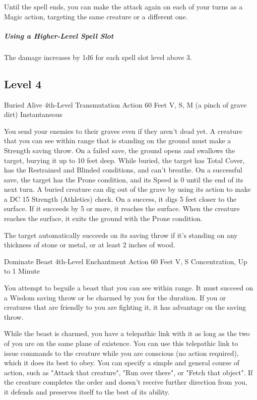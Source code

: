 \documentclass[letterpaper,openany,oneside,twocolumn]{book}
\begin{document}
Until the spell ends, you can make the attack again on each of your turns as a Magic action, targeting the same creature or a different one.

\subparagraph*{Using a Higher-Level Spell Slot} The damage increases by 1d6 for each spell slot level above 3.

\subsection*{Level 4}

\DndSpellHeader
  {Buried Alive}
  {4th-Level Transmutation}
  {Action}
  {60 Feet}
  {V, S, M (a pinch of grave dirt)}
  {Instantaneous}

You send your enemies to their graves even if they aren't dead yet. A creature that you can see within range that is standing on the ground must make a Strength saving throw. On a failed save, the ground opens and swallows the target, burying it up to 10 feet deep. While buried, the target has Total Cover, has the Restrained and Blinded conditions, and can't breathe. On a successful save, the target has the Prone condition, and its Speed is 0 until the end of its next turn. A buried creature can dig out of the grave by using its action to make a DC 15 Strength (Athletics) check. On a success, it digs 5 feet closer to the surface. If it succeeds by 5 or more, it reaches the surface. When the creature reaches the surface, it exits the ground with the Prone condition.

The target automatically succeeds on its saving throw if it's standing on any thickness of stone or metal, or at least 2 inches of wood.

\DndSpellHeader
  {Dominate Beast}
  {4th-Level Enchantment}
  {Action}
  {60 Feet}
  {V, S}
  {Concentration, Up to 1 Minute}

You attempt to beguile a beast that you can see within range. It must succeed on a Wisdom saving throw or be charmed by you for the duration. If you or creatures that are friendly to you are fighting it, it has advantage on the saving throw.

While the beast is charmed, you have a telepathic link with it as long as the two of you are on the same plane of existence. You can use this telepathic link to issue commands to the creature while you are conscious (no action required), which it does its best to obey. You can specify a simple and general course of action, such as "Attack that creature", "Run over there", or "Fetch that object". If the creature completes the order and doesn't receive further direction from you, it defends and preserves itself to the best of its ability.
\end{document}
